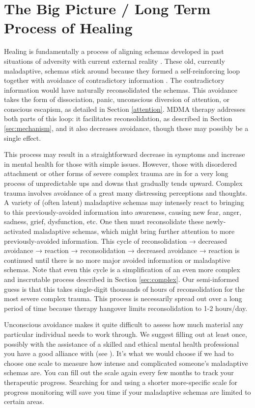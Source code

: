 \documentclass[12pt,letterpaper]{book}
\begin{document}
\section{The Big Picture / Long Term Process of Healing}
\label{bigPicture}
Healing is fundamentally a process of aligning schemas developed in past situations of adversity with current external reality \cite{eckerUnlocking}. These old, currently maladaptive, schemas stick around because they formed a self-reinforcing loop together with avoidance of contradictory information \cite{berghSelfEvidencing}. The contradictory information would have naturally reconsolidated the schemas. This avoidance takes the form of dissociation, panic, unconscious diversion of attention, or conscious escapism, as detailed in Section \ref{attention}. MDMA therapy addresses both parts of this loop: it facilitates reconsolidation, as described in Section \ref{sec:mechanism}, and it also decreases avoidance, though these may possibly be a single effect.

This process may result in a straightforward decrease in symptoms and increase in mental health for those with simple issues. However, those with disordered attachment or other forms of severe complex trauma are in for a very long process of unpredictable ups and downs that gradually tends upward. Complex trauma involves avoidance of a great many distressing perceptions and thoughts. A variety of (often latent) maladaptive schemas may intensely react to bringing to this previously-avoided information into awareness, causing new fear, anger, sadness, grief, dysfunction, etc. One then must reconsolidate these newly-activated maladaptive schemas, which might bring further attention to more previously-avoided information. This cycle of reconsolidation → decreased avoidance → reaction → reconsolidation → decreased avoidance → reaction is continued until there is no more major avoided information or maladaptive schemas. Note that even this cycle is a simplification of an even more complex and inscrutable process described in Section \ref{sec:complex}. Our semi-informed guess is that this takes single-digit thousands of hours of reconsolidation for the most severe complex trauma. This process is necessarily spread out over a long period of time because therapy hangover limits reconsolidation to 1-2 hours/day.

Unconscious avoidance makes it quite difficult to assess how much material any particular individual needs to work through. We suggest filling out \textcite{maladaptiveSchemaScale} at least once, possibly with the assistance of a skilled and ethical mental health professional you have a good alliance with (see \textcite{BRWAIdownload}). It's what we would choose if we had to choose one scale to measure how intense and complicated someone's maladaptive schemas are. You can fill out the scale again every few months to track your therapeutic progress. Searching for and using a shorter more-specific scale for progress monitoring will save you time if your maladaptive schemas are limited to certain areas.
\end{document}
